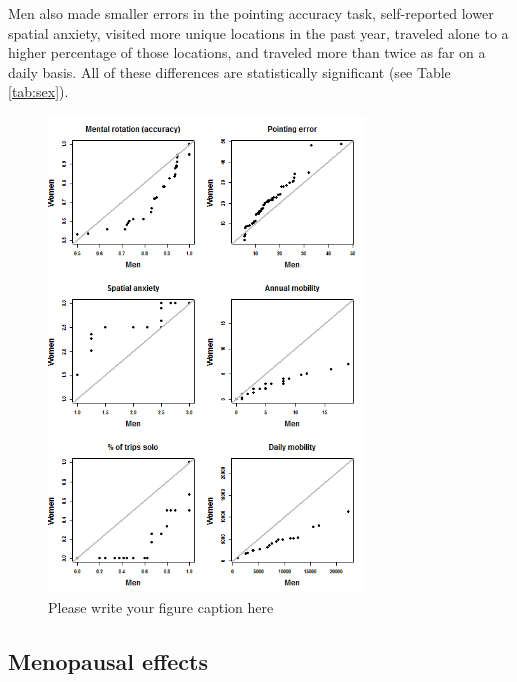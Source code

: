Men also made smaller errors in the pointing accuracy task, self-reported lower spatial anxiety, visited more unique locations in the past year, traveled alone to a higher percentage of those locations, and traveled more than twice as far on a daily basis.  All of these differences are statistically significant (see Table \ref{tab:sex}).

\begin{figure}[!htb]
  \includegraphics[width=0.75\textwidth]{QQ_sex}
\caption{Please write your figure caption here}
\label{fig:sex}       %
\end{figure}


	\subsection{Menopausal effects}
	\label{sec:3.2}
	
